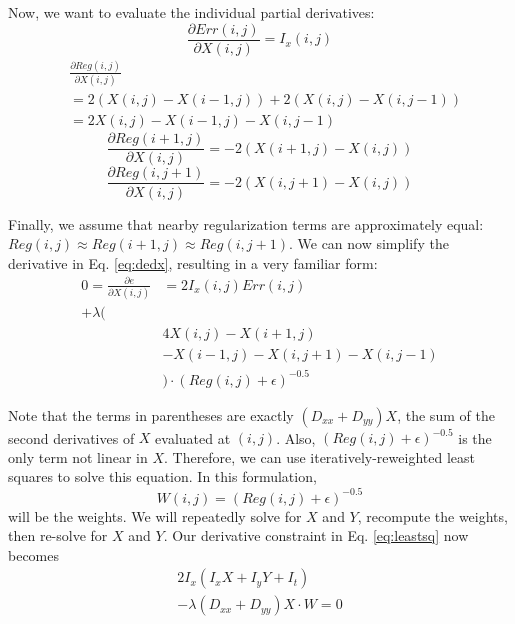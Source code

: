 \documentclass[10pt,twocolumn,letterpaper]{article}
\begin{document}
Now, we want to evaluate the individual partial derivatives:
\begin{equation} \label{eq:derrdx}
\frac{\partial Err(i,j)}{\partial X(i, j)} = I_x(i, j)
\end{equation}
\begin{equation} \label{eq:dreg1dx}
\begin{aligned}
&\frac{\partial Reg(i,j)}{\partial X(i, j)} \\
&= 2(X(i, j) - X(i-1, j)) + 2(X(i, j) - X(i, j-1)) \\
&= 2X(i,j) - X(i-1, j) - X(i,j-1)
\end{aligned}
\end{equation}
\begin{equation} \label{eq:dreg2dx}
\frac{\partial Reg(i+1,j)}{\partial X(i, j)} = -2(X(i+1,j) - X(i,j))
\end{equation}
\begin{equation} \label{eq:dreg3dx}
\frac{\partial Reg(i,j+1)}{\partial X(i, j)} = -2(X(i,j+1) - X(i,j))
\end{equation}

Finally, we assume that nearby regularization terms are approximately equal: $Reg(i, j) \approx Reg(i+1,j) \approx Reg(i,j+1)$.  We can now simplify the derivative in Eq. \ref{eq:dedx}, resulting in a very familiar form:
\begin{equation} \label{eq:leastsq}
\begin{aligned}
0 = \frac{\partial e}{\partial X(i, j)} &= 2I_x(i, j) Err(i, j)  \\
+\lambda(&\\
&4X(i, j) - X(i+1,j) \\
&- X(i-1,j) - X(i,j+1) - X(i,j-1) \\
&)\cdot (Reg(i, j) + \epsilon) ^{-0.5}
\end{aligned}
\end{equation}

Note that the terms in parentheses are exactly $(D_{xx} + D_{yy}) X$, the sum of the second derivatives of $X$ evaluated at $(i, j)$.  Also, $(Reg(i, j) + \epsilon)^{-0.5}$ is the only term not linear in $X$.  Therefore, we can use iteratively-reweighted least squares to solve this equation.  In this formulation,
\begin{equation} \label{eq:weights}
W(i,j) = (Reg(i,j) + \epsilon)^{-0.5}
\end{equation}
will be the weights.  We will repeatedly solve for $X$ and $Y$, recompute the weights, then re-solve for $X$ and $Y$.  Our derivative constraint in Eq. \ref{eq:leastsq} now becomes
\begin{equation} \label{eq:leastsqx}
\begin{aligned}
2I_x (I_x X + I_y Y + I_t) \\
 -\lambda(D_{xx} + D_{yy}) X \cdot W = 0
\end{aligned}
\end{equation}
\end{document}
